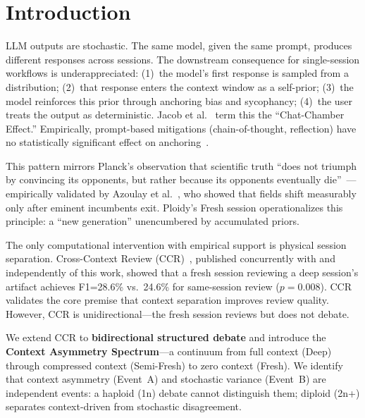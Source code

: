 \documentclass{article}
\begin{document}
\section{Introduction}
\label{sec:introduction}

LLM outputs are stochastic. The same model, given the same prompt, produces different responses across sessions. The downstream consequence for single-session workflows is underappreciated: (1)~the model's first response is sampled from a distribution; (2)~that response enters the context window as a self-prior; (3)~the model reinforces this prior through anchoring bias and sycophancy; (4)~the user treats the output as deterministic. Jacob et al.~\citep{jacob2025chatchamber} term this the ``Chat-Chamber Effect.'' Empirically, prompt-based mitigations (chain-of-thought, reflection) have no statistically significant effect on anchoring~\citep{feng2026anchoring}.

This pattern mirrors Planck's observation that scientific truth ``does not triumph by convincing its opponents, but rather because its opponents eventually die''~\citep{planck1950}---empirically validated by Azoulay et al.~\citep{azoulay2019}, who showed that fields shift measurably only after eminent incumbents exit. Ploidy's Fresh session operationalizes this principle: a ``new generation'' unencumbered by accumulated priors.

The only computational intervention with empirical support is physical session separation. Cross-Context Review (CCR)~\citep{song2026ccr}, published concurrently with and independently of this work, showed that a fresh session reviewing a deep session's artifact achieves F1=28.6\% vs.\ 24.6\% for same-session review ($p=0.008$). CCR validates the core premise that context separation improves review quality. However, CCR is unidirectional---the fresh session reviews but does not debate.

We extend CCR to \textbf{bidirectional structured debate} and introduce the \textbf{Context Asymmetry Spectrum}---a continuum from full context (Deep) through compressed context (Semi-Fresh) to zero context (Fresh). We identify that context asymmetry (Event~A) and stochastic variance (Event~B) are independent events: a haploid (1n) debate cannot distinguish them; diploid (2n+) separates context-driven from stochastic disagreement.
\end{document}
